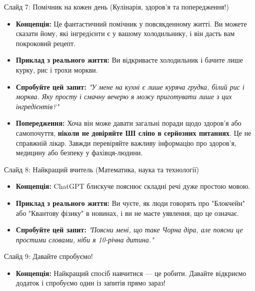 \documentclass[aspectratio=169]{beamer}
\begin{document}
\begin{frame}{Слайд 7: Помічник на кожен день (Кулінарія, здоров'я та попередження!)}
    \begin{itemize}
        \item \textbf{Концепція:} Це фантастичний помічник у повсякденному житті. Ви можете сказати йому, які інгредієнти є у вашому холодильнику, і він дасть вам покроковий рецепт.
        \item \textbf{Приклад з реального життя:} Ви відкриваєте холодильник і бачите лише курку, рис і трохи моркви.
        \item \textbf{Спробуйте цей запит:} \textit{"У мене на кухні є лише куряча грудка, білий рис і морква. Яку просту і смачну вечерю я можу приготувати лише з цих інгредієнтів?"}
        \item \textbf{Попередження:} Хоча він може давати загальні поради щодо здоров'я або самопочуття, \textbf{ніколи не довіряйте ШІ сліпо в серйозних питаннях}. Це не справжній лікар. Завжди перевіряйте важливу інформацію про здоров'я, медицину або безпеку у фахівця-людини.
    \end{itemize}
\end{frame}

\begin{frame}{Слайд 8: Найкращий вчитель (Математика, наука та технології)}
    \begin{itemize}
        \item \textbf{Концепція:} ChatGPT блискуче пояснює складні речі дуже простою мовою.
        \item \textbf{Приклад з реального життя:} Ви чуєте, як люди говорять про "Блокчейн" або "Квантову фізику" в новинах, і ви не маєте уявлення, що це означає.
        \item \textbf{Спробуйте цей запит:} \textit{"Поясни мені, що таке Чорна діра, але поясни це простими словами, ніби я 10-річна дитина."}
    \end{itemize}
\end{frame}

\begin{frame}{Слайд 9: Давайте спробуємо!}
    \begin{itemize}
        \item \textbf{Концепція:} Найкращий спосіб навчитися — це робити. Давайте відкриємо додаток і спробуємо один із запитів прямо зараз!
    \end{itemize}
\end{frame}
\end{document}

